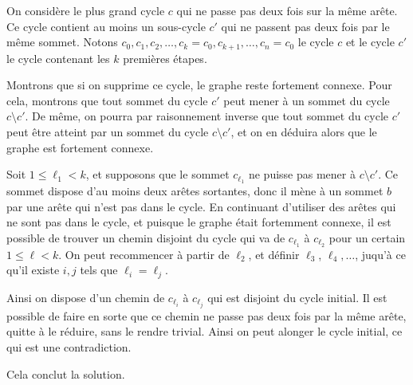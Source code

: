 \begin{sol}
On considère le plus grand cycle $c$ qui ne passe pas deux fois sur la même arête. Ce cycle contient au moins un sous-cycle $c'$ qui ne passent pas deux fois par le même sommet. Notons $c_0, c_1, c_2, \dots, c_k = c_0, c_{k + 1}, \dots, c_n = c_0$ le cycle $c$ et le cycle $c'$ le cycle contenant les $k$ premières étapes.

\medskip

Montrons que si on supprime ce cycle, le graphe reste fortement connexe. Pour cela, montrons que tout sommet du cycle $c'$ peut mener à un sommet du cycle $c\setminus c'$. De même, on pourra par raisonnement inverse que tout sommet du cycle $c'$ peut être atteint par un sommet du cycle $c\setminus c'$, et on en déduira alors que le graphe est fortement connexe.

\medskip

Soit $1\le\ell_1<k$, et supposons que le sommet $c_{\ell_1}$ ne puisse pas mener à $c\setminus c'$. Ce sommet dispose d'au moins deux arêtes sortantes, donc il mène à un sommet $b$ par une arête qui n'est pas dans le cycle. En continuant d'utiliser des arêtes qui ne sont pas dans le cycle, et puisque le graphe était fortemment connexe, il est possible de trouver un chemin disjoint du cycle qui va de $c_{\ell_1}$ à $c_{\ell_2}$ pour un certain $1\le\ell<k$. On peut recommencer à partir de $\ell_2$, et définir $\ell_3$, $\ell_4,\dots$, juqu'à ce qu'il existe $i,j$ tels que $\ell_i=\ell_j$.

Ainsi on dispose d'un chemin de $c_{\ell_i}$ à $c_{\ell_j}$ qui est disjoint du cycle initial. Il est possible de faire en sorte que ce chemin ne passe pas deux fois par la même arête, quitte à le réduire, sans le rendre trivial. Ainsi on peut alonger le cycle initial, ce qui est une contradiction.

\medskip

Cela conclut la solution.
\end{sol}
